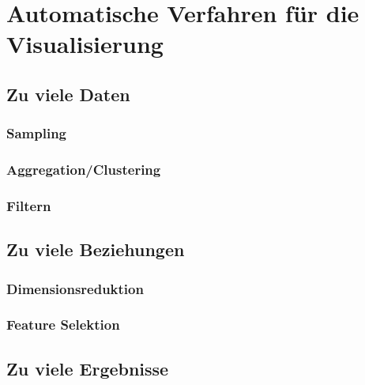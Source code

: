     \section{Automatische Verfahren für die Visualisierung} %

        \subsection{Zu viele Daten} %

            \subsubsection{Sampling} %

            \subsubsection{Aggregation/Clustering} %

            \subsubsection{Filtern} %

        \subsection{Zu viele Beziehungen} %

            \subsubsection{Dimensionsreduktion} %

            \subsubsection{Feature Selektion} %

        \subsection{Zu viele Ergebnisse} %

